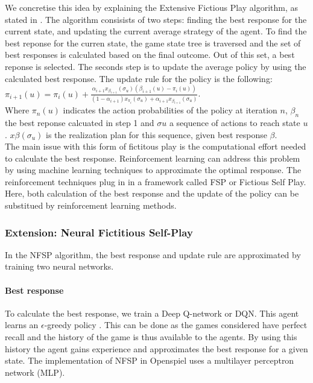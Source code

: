 \documentclass[10pt,a4paper]{article}
\begin{document}
We concretise this idea by explaining the Extensive Fictious Play algorithm, as stated in \cite{fsp-ext}. The algorithm consisists of two steps: finding the best response for the current state, and updating the current average strategy of the agent.
To find the best reponse for the curren state, the game state tree is traversed and the set of best responses is calculated based on the final outcome. Out of this set, a best reponse is selected.
The seconds step is to update the average policy by using the calculated best response. The update rule for the policy is the following:
\begin{math}
\pi_{i+1}(u) = \pi_{i}(u) + \frac{\alpha_{i+1}x_{\beta_{i+1}}(\sigma_{u})(\beta_{i+1}(u) - \pi_i(u))}{(1-\alpha_{i+1})x_{\pi_i}(\sigma_{u}) + \alpha_{i+1}x_{\beta_{i+1}}(\sigma_u)}
\end{math}.\\
Where $\pi_n(u)$ indicates the action probabilities of the policy at iteration $n$, $\beta_n$ the best reponse calcuated in step 1 and $\sigma{u}$ a sequence of actions to reach state $u$. $x{\beta}(\sigma_u)$ is the realization plan for this sequence, given best response $\beta$.\\
The main issue with this form of fictitous play is the computational effort needed to calculate the best response. 
Reinforcement learning can address this problem by using machine learning techniques to approximate the optimal response.
The reinforcement techniques plug in in a framework called FSP or Fictious Self Play. Here, both calculation of the best response and the update of the policy can be substitued by reinforcement learning methods.

\subsubsection{Extension: Neural Fictitious Self-Play}
In the NFSP algorithm, the best response and update rule are approximated by training two neural networks.
\paragraph{Best response}
To calculate the best response, we train a Deep Q-network or DQN. This agent learns an $\epsilon$-greedy policy \cite{heinrichphd}. 
This can be done as the games considered have perfect recall and the history of the game is thus available to the agents. By using this history the agent gains experience and approximates the best response for a given state.
The implementation of NFSP in Openspiel uses a multilayer perceptron network (MLP).
\end{document}
